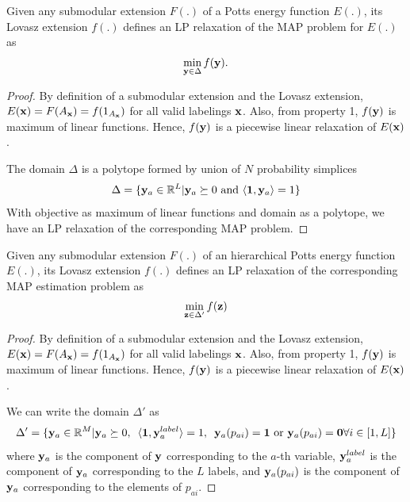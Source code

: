 {\lemma Given any submodular extension $F(.)$ of a Potts energy function $E(.)$, its Lovasz extension $f(.)$ defines an LP relaxation of the MAP problem for $E(.)$ as 
\begin{align}
    \min_{{\bf y} \in \Delta} f({\bf y}).
\end{align}
\begin{proof}
    By definition of a submodular extension and the Lovasz extension, $E({\bf x}) = F(A_{\bf x}) = f(1_{A_{\bf x}})$ for all valid labelings ${\bf x}$. Also, from property 1, $f({\bf y})$ is maximum of linear functions. Hence, $f({\bf y})$ is a piecewise linear relaxation of $E({\bf x})$.

    The domain $\Delta$ is a polytope formed by union of $N$ probability simplices
\begin{equation}
    \Delta = \{{\bf y}_a \in \mathbb{R}^L | {\bf y}_a \succeq 0  \textrm{ and } \langle {\bf 1}, {\bf y}_a \rangle = 1\}
\end{equation}
With objective as maximum of linear functions and domain as a polytope, we have an LP relaxation of the corresponding MAP problem.
\end{proof}


{\lemma Given any submodular extension $F(.)$ of an hierarchical Potts energy function $E(.)$, its Lovasz extension $f(.)$ defines an LP relaxation of the corresponding MAP estimation problem as
\begin{align}
    \min_{{\bf z} \in \Delta'} f({\bf z}) 
\end{align}

\begin{proof}
    By definition of a submodular extension and the Lovasz extension, $E({\bf x}) = F(A_{\bf x}) = f(1_{A_{\bf x}})$ for all valid labelings ${\bf x}$. Also, from property 1, $f({\bf y})$ is maximum of linear functions. Hence, $f({\bf y})$ is a piecewise linear relaxation of $E({\bf x})$.

    We can write the domain $\Delta'$ as 
    \begin{equation}
    \Delta' = \{ {\bf y}_a \in \mathbb{R}^M | {\bf y}_a \succeq 0, \enskip \langle {\bf 1}, {\bf y}_a^{label} \rangle = 1, \enskip {\bf y}_a(p_{ai}) = {\bf 1} \textrm{ or } {\bf y}_a(p_{ai}) = {\bf 0} \forall i \in [1, L]\}
    \end{equation} 
where ${\bf y}_a$ is the component of $\bf y$ corresponding to the $a$-th variable, ${\bf y}_a^{label}$  is the component of ${\bf y}_a$ corresponding to the $L$ labels, and ${\bf y}_a(p_{ai})$ is the component of ${\bf y}_a$ corresponding to the elements of $p_{ai}$. 


\end{proof}}}

